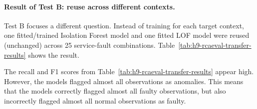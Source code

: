 \paragraph{Result of Test B: reuse across different contexts.}
Test B focuses a different question. Instead of training for each target context, one fitted/trained Isolation Forest model and one fitted LOF model were reused (unchanged) across 25 service-fault combinations. Table~\ref{tab:h9-rcaeval-transfer-results} shows the result.

\begin{table}[H]
    \centering
    \scriptsize
    \caption{Cross-context transfer stress test across 25 Train Ticket cases.}
    \label{tab:h9-rcaeval-transfer-results}
\end{table}




The recall and F1 scores from Table~\ref{tab:h9-rcaeval-transfer-results} appear high. However, the models flagged almost all observations as anomalies. This means that the models correctly flagged almost all faulty observations, but also incorrectly flagged almost all normal observations as faulty. 

